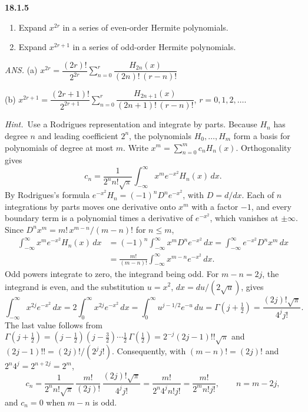 \par\bigskip
\noindent\textbf{18.1.5}
\begin{enumerate}
\item[(a)] Expand $x^{2r}$ in a series of even-order Hermite
polynomials.
\item[(b)] Expand $x^{2r+1}$ in a series of odd-order Hermite
polynomials.
\end{enumerate}
\par\nobreak\hfill\emph{ANS.}\enspace
(a) $x^{2r}=\dfrac{(2r)!}{2^{2r}}\displaystyle\sum_{n=0}^{r}
\dfrac{H_{2n}(x)}{(2n)!\,(r-n)!}$\par\nobreak
\hfill(b) $x^{2r+1}=\dfrac{(2r+1)!}{2^{2r+1}}
\displaystyle\sum_{n=0}^{r}\dfrac{H_{2n+1}(x)}{(2n+1)!\,(r-n)!}$,
\qquad $r=0,1,2,\ldots.$
\par\emph{Hint.}~Use a Rodrigues representation and integrate by
parts.
\solution
Because $H_n$ has degree $n$ and leading coefficient $2^n$, the
polynomials $H_0,\ldots,H_m$ form a basis for polynomials of degree
at most $m$.  Write $x^m=\sum_{n=0}^m c_nH_n(x)$.  Orthogonality gives
\[
c_n=\frac1{2^nn!\sqrt\pi}
 \int_{-\infty}^{\infty}x^me^{-x^2}H_n(x)\,dx.
\]
By Rodrigues's formula $e^{-x^2}H_n=(-1)^nD^ne^{-x^2}$, with $D=d/dx$.
Each of $n$ integrations by parts moves one derivative onto $x^m$ with a
factor $-1$, and every boundary term is a polynomial times a derivative
of $e^{-x^2}$, which vanishes at $\pm\infty$.  Since
$D^nx^m=m!\,x^{m-n}/(m-n)!$ for $n\le m$,
\begin{align*}
\int_{-\infty}^{\infty}x^me^{-x^2}H_n(x)\,dx
 &=(-1)^n\int_{-\infty}^{\infty}x^mD^ne^{-x^2}\,dx
 =\int_{-\infty}^{\infty}e^{-x^2}D^nx^m\,dx\\
 &=\frac{m!}{(m-n)!}\int_{-\infty}^{\infty}x^{m-n}e^{-x^2}\,dx.
\end{align*}
Odd powers integrate to zero, the integrand being odd.  For $m-n=2j$,
the integrand is even, and the substitution $u=x^2$, $dx=du/(2\sqrt u)$,
gives
\[
\int_{-\infty}^{\infty}x^{2j}e^{-x^2}\,dx
 =2\int_0^\infty x^{2j}e^{-x^2}\,dx
 =\int_0^\infty u^{j-1/2}e^{-u}\,du
 =\Gamma(j+\tfrac12)=\frac{(2j)!\sqrt\pi}{4^jj!}.
\]
The last value follows from
$\Gamma(j+\frac12)=(j-\frac12)(j-\frac32)\cdots\frac12\,\Gamma(\frac12)
=2^{-j}(2j-1)!!\sqrt\pi$ and $(2j-1)!!=(2j)!/(2^jj!)$.
Consequently, with $(m-n)!=(2j)!$ and $2^n4^j=2^{n+2j}=2^m$,
\[
c_n=\frac1{2^nn!\sqrt\pi}\,\frac{m!}{(2j)!}\,
 \frac{(2j)!\sqrt\pi}{4^jj!}
 =\frac{m!}{2^n4^jn!j!}
 =\frac{m!}{2^mn!j!},\qquad n=m-2j,
\]
and $c_n=0$ when $m-n$ is odd.

